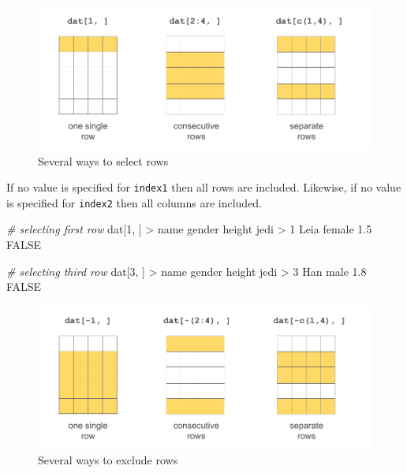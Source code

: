 \documentclass[
]{book}
\newenvironment{Shaded}{\begin{snugshade}}{\end{snugshade}}
\newcommand{\CommentTok}[1]{\textcolor[rgb]{0.56,0.35,0.01}{\textit{#1}}}
\newcommand{\ConstantTok}[1]{\textcolor[rgb]{0.00,0.00,0.00}{#1}}
\newcommand{\DecValTok}[1]{\textcolor[rgb]{0.00,0.00,0.81}{#1}}
\newcommand{\FloatTok}[1]{\textcolor[rgb]{0.00,0.00,0.81}{#1}}
\newcommand{\NormalTok}[1]{#1}
\newcommand{\SpecialCharTok}[1]{\textcolor[rgb]{0.00,0.00,0.00}{#1}}
\begin{document}
\begin{figure}

{\centering \includegraphics[width=0.8\linewidth]{images/objects/obj-dataframe-rows1} 

}

\caption{Several ways to select rows}\label{fig:unnamed-chunk-181}
\end{figure}

If no value is specified for \texttt{index1} then all rows are included. Likewise,
if no value is specified for \texttt{index2} then all columns are included.

\begin{Shaded}
\begin{Highlighting}[]
\CommentTok{\# selecting first row}
\NormalTok{dat[}\DecValTok{1}\NormalTok{, ]}
\SpecialCharTok{\textgreater{}}\NormalTok{   name gender height  jedi}
\SpecialCharTok{\textgreater{}} \DecValTok{1}\NormalTok{ Leia female    }\FloatTok{1.5} \ConstantTok{FALSE}

\CommentTok{\# selecting third row}
\NormalTok{dat[}\DecValTok{3}\NormalTok{, ]}
\SpecialCharTok{\textgreater{}}\NormalTok{   name gender height  jedi}
\SpecialCharTok{\textgreater{}} \DecValTok{3}\NormalTok{  Han   male    }\FloatTok{1.8} \ConstantTok{FALSE}
\end{Highlighting}
\end{Shaded}

\begin{figure}

{\centering \includegraphics[width=0.8\linewidth]{images/objects/obj-dataframe-rows2} 

}

\caption{Several ways to exclude rows}\label{fig:unnamed-chunk-183}
\end{figure}
\end{document}
